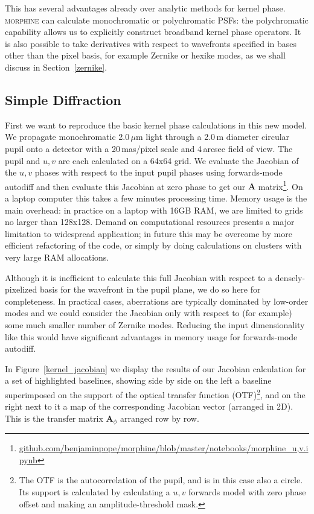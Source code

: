 \documentclass[modern]{aastex63}
\begin{document}
This has several advantages already over analytic methods for kernel phase. \textsc{morphine} can calculate monochromatic or polychromatic PSFs: the polychromatic capability allows us to explicitly construct broadband kernel phase operators. It is also possible to take derivatives with respect to wavefronts specified in bases other than the pixel basis, for example Zernike or hexike modes, as we shall discuss in Section~\ref{zernike}.

\subsection{Simple Diffraction}
\label{sec:simple}

First we want to reproduce the basic kernel phase calculations in this new model. We propagate monochromatic 2.0\,$\mu$m light through a 2.0\,m diameter circular pupil onto a detector with a 20\,mas/pixel scale and 4\,arcsec field of view. The pupil and $u,v$ are each calculated on a 64x64 grid. We evaluate the Jacobian of the $u,v$ phases with respect to the input pupil phases using forwards-mode autodiff and then evaluate this Jacobian at zero phase to get our $\mathbf{A}$ matrix\footnote{\href{https://github.com/benjaminpope/morphine/blob/master/notebooks/morphine_u,v.ipynb}{github.com/benjaminpope/morphine/blob/master/notebooks/morphine\_u,v.ipynb}}. On a laptop computer this takes a few minutes processing time. Memory usage is the main overhead: in practice on a laptop with 16GB RAM, we are limited to grids no larger than 128x128. Demand on computational resources presents a major limitation to widespread application; in future this may be overcome by more efficient refactoring of the code, or simply by doing calculations on clusters with very large RAM allocations.

Although it is inefficient to calculate this full Jacobian with respect to a densely-pixelized basis for the wavefront in the pupil plane, we do so here for completeness. In practical cases, aberrations are typically dominated by low-order modes and we could consider the Jacobian only with respect to (for example) some much smaller number of Zernike modes. Reducing the input dimensionality like this would have significant advantages in memory usage for forwards-mode autodiff.

In Figure~\ref{kernel_jacobian} we display the results of our Jacobian calculation for a set of highlighted baselines, showing side by side on the left a baseline superimposed on the support of the optical transfer function (OTF)\footnote{The OTF is the autocorrelation of the pupil, and is in this case also a circle. Its support is calculated by calculating a $u,v$ forwards model with zero phase offset and making an amplitude-threshold mask.}, and on the right next to it a map of the corresponding Jacobian vector (arranged in 2D). This is the transfer matrix $\mathbf{A}_\phi$ arranged row by row.  
\end{document}
